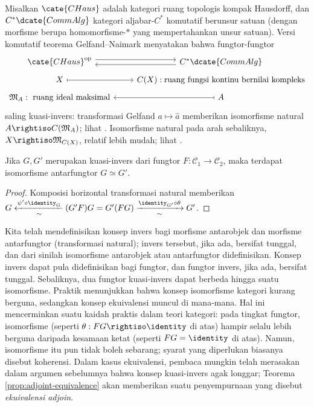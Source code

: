 \begin{example}
	Misalkan $\cate{CHaus}$ adalah kategori ruang topologis kompak Hausdorff, dan $C^*\dcate{CommAlg}$ kategori aljabar-$C^*$ komutatif berunsur satuan (dengan morfisme berupa homomorfisme-$\ast$ yang mempertahankan unsur satuan). Versi komutatif teorema Gelfand--Naimark menyatakan bahwa fungtor-fungtor
	\[ \begin{tikzcd}[row sep=tiny]
		\cate{CHaus}^{\text{op}} \arrow[yshift=0.7ex]{r} & C^*\dcate{CommAlg} \arrow[yshift=-0.7ex]{l} \\
		X \arrow[mapsto]{r} & C(X): \text{ruang fungsi kontinu bernilai kompleks} \\
		\mathfrak{M}_A: \text{ ruang ideal maksimal} & A \arrow[mapsto]{l}
	\end{tikzcd} \]
	saling kuasi-invers: transformasi Gelfand $a \mapsto \hat{a}$ memberikan isomorfisme natural $A \rightiso C(\mathfrak{M}_A)$; lihat \cite[Teorema 5.4.8]{Zh2}. Isomorfisme natural pada arah sebaliknya, $X \rightiso \mathfrak{M}_{C(X)}$, relatif lebih mudah; lihat \cite[Teorema 5.3.2]{Zh2}.
\end{example}

\begin{proposition}
	Jika $G, G'$ merupakan kuasi-invers dari fungtor $F: \mathcal{C}_1 \to \mathcal{C}_2$, maka terdapat isomorfisme antarfungtor $G \simeq G'$.
\end{proposition}
\begin{proof}
	Komposisi horizontal transformasi natural memberikan $G \xleftarrow[\sim]{\psi' \circ \identity_G} (G'F)G = G'(FG) \xrightarrow[\sim]{\identity_{G'} \circ \theta} G'$.
\end{proof}

\begin{remark}\label{rem:strict-or-not}
	Kita telah mendefinisikan konsep invers bagi morfisme antarobjek dan morfisme antarfungtor (transformasi natural); invers tersebut, jika ada, bersifat tunggal, dan dari sinilah isomorfisme antarobjek atau antarfungtor didefinisikan. Konsep invers dapat pula didefinisikan bagi fungtor, dan fungtor invers, jika ada, bersifat tunggal. Sebaliknya, dua fungtor kuasi-invers dapat berbeda hingga suatu isomorfisme. Praktik menunjukkan bahwa konsep isomorfisme kategori kurang berguna, sedangkan konsep ekuivalensi muncul di mana-mana. Hal ini mencerminkan suatu kaidah praktis dalam teori kategori: pada tingkat fungtor, isomorfisme (seperti $\theta: FG \rightiso \identity$ di atas) hampir selalu lebih berguna daripada kesamaan ketat (seperti $FG = \identity$ di atas). Namun, isomorfisme itu pun tidak boleh sebarang; syarat yang diperlukan biasanya disebut koherensi. Dalam kasus ekuivalensi, pembaca mungkin telah merasakan dalam argumen sebelumnya bahwa konsep kuasi-invers agak longgar; Teorema \ref{prop:adjoint-equivalence} akan memberikan suatu penyempurnaan yang disebut \emph{ekuivalensi adjoin}. 
\end{remark}

